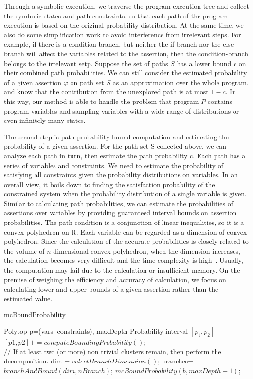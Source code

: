 \documentclass[runningheads]{llncs}
\begin{document}
Through a symbolic execution, we traverse the program execution tree and collect the symbolic states and path constraints, so that each path of the program execution is based on the original probability distribution. At the same time, we also do some simplification work to avoid interference from irrelevant steps. For example, if there is a condition-branch, but neither the if-branch nor the else-branch will affect the variables related to the assertion, then the condition-branch belongs to the irrelevant setp.
Suppose the set of paths $S$ has a lower bound c on their combined path probabilities. We can still consider the estimated probability of a given assertion $\varphi$ on path set $S$ as an approximation over the whole program, and know that the contribution from the unexplored path is at most $1-c$. In this way, our method is able to handle the problem that program $P$ contains program variables and sampling variables with a wide range of distributions or even infinitely many states. 

The second step is path probability bound computation and estimating the probability of a given assertion. 
For the path set S collected above, we can analyze each path in turn, then estimate the path probability c. Each path has a series of variables and constraints. We need to estimate the probability of satisfying all constraints given the probability distributions on variables. In an overall view, it boils down to finding the satisfaction probability of the constrained system when the probability distribution of a single variable is given. Similar to calculating path probabilities, we can estimate the probabilities of assertions over variables by providing guaranteed interval bounds on assertion probabilities. The path condition is a conjunction of linear inequalities, so it is a convex polyhedron on R. Each variable can be regarded as a dimension of convex polyhedron.
Since the calculation of the accurate probabilities is closely related to the volume of $n$-dimensional convex polyhedron, when the dimension increases, the calculation becomes very difficult and the time complexity is high~\cite{Arora1998Proof}. Usually, the computation may fail due to the calculation or insufficient memory. 
On the premise of weighing the efficiency and accuracy of calculation, we focus on calculating lower and upper bounds of a given assertion rather than the estimated value. 

\begin{algorithm}	
	\caption{mcBoundProbability}	
	\label{mcBoundProbability}	
	\begin{algorithmic}[1]	
		\REQUIRE Polytop p=(vars, constraints), maxDepth		
		\ENSURE Probability interval $[p_1, p_2]$		
		\STATE $[p1,p2]+=computeBoundingProbability()$;	
		\ENDIF  \\		
		$//$ If at least two (or more) non trivial clusters remain, then perform the decomposition.  		
		\STATE dim = $selectBranchDimension()$;		
		\STATE branches= $branchAndBound(dim, nBranch)$;		
		\STATE $mcBoundProbability(b, maxDepth-1)$;		
		\ENDFOR
		\ENDIF
	\end{algorithmic}
\end{algorithm}
\end{document}

